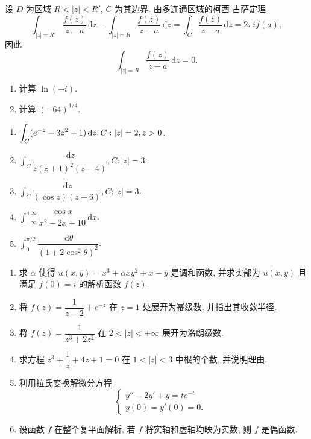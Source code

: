 \documentclass[simple]{hfutexam}
\newcommand{\diff}{\,\mathrm{d}}
\let\Im\relax
\DeclareMathOperator\Im{Im}
\begin{document}
设 $D$ 为区域 $R<|z|<R'$, $C$ 为其边界.
由多连通区域的柯西-古萨定理
\[\int_{|z|=R'} \frac{f(z)}{z-a}\diff z-\int_{|z|=R} \frac{f(z)}{z-a}\diff z=\int_C \frac{f(z)}{z-a}\diff z=2\pi if(a),\]
因此
  \[\int_{|z|=R} \frac{f(z)}{z-a}\diff z=0.\]

\newpage
{}
\maketitle

\begin{enumerate}
\item 计算 $\ln (-i)$.
\item 计算 $(-64)^{1/4}$.
\end{enumerate}

\begin{enumerate}
\item $\displaystyle\int_C(e^{-z}-3z^2+1)\diff z, C:|z|=2,\Im z>0$.
\item $\displaystyle\int_C\dfrac{\diff z}{z(z+1)^2(z-4)}, C:|z|=3$.
\item $\displaystyle\int_C\dfrac{\diff z}{(\cos z)(z-6)}, C:|z|=3$.
\item $\displaystyle\int_{-\infty}^{+\infty}\dfrac{\cos x}{x^2-2x+10}\diff x$.
\item $\displaystyle\int_0^{\pi/2}\dfrac{\diff \theta}{(1+2\cos^2\theta)^2}$.
\end{enumerate}

\begin{enumerate}
\item 求 $\alpha$ 使得 $u(x,y)=x^3+\alpha xy^2+x-y$ 是调和函数, 并求实部为 $u(x,y)$ 且满足 $f(0)=i$ 的解析函数 $f(z)$.
\item 将 $f(z)=\dfrac{1}{z-2}+e^{-z}$ 在 $z=1$ 处展开为幂级数, 并指出其收敛半径.
\item 将 $f(z)=\dfrac{1}{z^3+2z^2}$ 在 $2<|z|<+\infty$ 展开为洛朗级数.
\item 求方程 $z^3+\dfrac{1}{z}+4z+1=0$ 在 $1<|z|<3$ 中根的个数, 并说明理由.
\item 利用拉氏变换解微分方程 
\[\begin{cases}
y''-2y'+y=te^{-t}&\\
y(0)=y'(0)=0.&
\end{cases}\]
\item 设函数 $f$ 在整个复平面解析, 若 $f$ 将实轴和虚轴均映为实数, 则 $f$ 是偶函数.
\end{enumerate}
\end{document}
